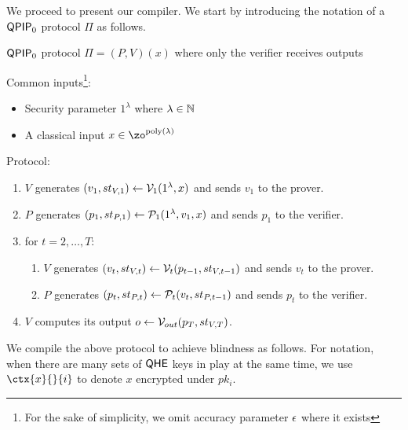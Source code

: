 \fi



We proceed to present our compiler. We start by introducing the notation of a $\operatorname{\mathsf{QPIP}}_0$ protocol $\Pi$ as follows.

\begin{protocol}{$\operatorname{\mathsf{QPIP}}_0$ protocol $\Pi=(P, V)(x)$ where only the verifier receives outputs}
    
    Common inputs\footnote{For the sake of simplicity, we omit accuracy parameter $\epsilon$ where it exists}:
    \begin{itemize}
        \item Security parameter $1^\lambda$ where $\lambda\in\mathbb{N}$
        \item A classical input $x\in\zo^{\poly(\lambda)}$
    \end{itemize}

    Protocol:
    \begin{enumerate}
        \item $V$ generates $(v_1, st_{V, 1})\leftarrow\mathcal{V}_1(1^\lambda, x)$ and sends $v_1$ to the prover.
        \item $P$ generates $(p_1, st_{P, 1})\leftarrow\mathcal{P}_1(1^\lambda, v_1, x)$ and sends $p_1$ to the verifier.
        \item for $t=2,\ldots,T$:
        \begin{enumerate}
            \item $V$ generates $(v_t, st_{V, t})\leftarrow\mathcal{V}_t(p_{t-1}, st_{V, t-1})$ and sends $v_t$ to the prover.
            \item $P$ generates $(p_t, st_{P, t})\leftarrow\mathcal{P}_t(v_t, st_{P, t-1})$ and sends $p_t$ to the verifier.
        \end{enumerate}
        \item $V$ computes its output $o\leftarrow\mathcal{V}_{out}(p_T, st_{V, T})$.
    \end{enumerate}

\end{protocol}

We compile the above protocol to achieve blindness as follows.
For notation, when there are many sets of $\mathsf{QHE}$ keys in play at the same time,
we use $\ctx{x}{}{i}$ to denote $x$ encrypted under $pk_i$.



